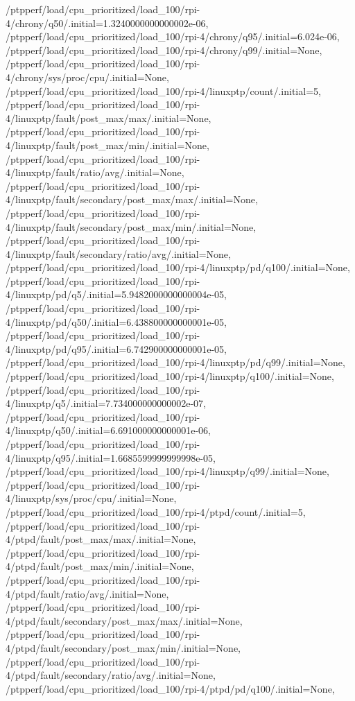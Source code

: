 {    /ptpperf/load/cpu_prioritized/load_100/rpi-4/chrony/q50/.initial=1.3240000000000002e-06,
    /ptpperf/load/cpu_prioritized/load_100/rpi-4/chrony/q95/.initial=6.024e-06,
    /ptpperf/load/cpu_prioritized/load_100/rpi-4/chrony/q99/.initial=None,
    /ptpperf/load/cpu_prioritized/load_100/rpi-4/chrony/sys/proc/cpu/.initial=None,
    /ptpperf/load/cpu_prioritized/load_100/rpi-4/linuxptp/count/.initial=5,
    /ptpperf/load/cpu_prioritized/load_100/rpi-4/linuxptp/fault/post_max/max/.initial=None,
    /ptpperf/load/cpu_prioritized/load_100/rpi-4/linuxptp/fault/post_max/min/.initial=None,
    /ptpperf/load/cpu_prioritized/load_100/rpi-4/linuxptp/fault/ratio/avg/.initial=None,
    /ptpperf/load/cpu_prioritized/load_100/rpi-4/linuxptp/fault/secondary/post_max/max/.initial=None,
    /ptpperf/load/cpu_prioritized/load_100/rpi-4/linuxptp/fault/secondary/post_max/min/.initial=None,
    /ptpperf/load/cpu_prioritized/load_100/rpi-4/linuxptp/fault/secondary/ratio/avg/.initial=None,
    /ptpperf/load/cpu_prioritized/load_100/rpi-4/linuxptp/pd/q100/.initial=None,
    /ptpperf/load/cpu_prioritized/load_100/rpi-4/linuxptp/pd/q5/.initial=5.9482000000000004e-05,
    /ptpperf/load/cpu_prioritized/load_100/rpi-4/linuxptp/pd/q50/.initial=6.438800000000001e-05,
    /ptpperf/load/cpu_prioritized/load_100/rpi-4/linuxptp/pd/q95/.initial=6.742900000000001e-05,
    /ptpperf/load/cpu_prioritized/load_100/rpi-4/linuxptp/pd/q99/.initial=None,
    /ptpperf/load/cpu_prioritized/load_100/rpi-4/linuxptp/q100/.initial=None,
    /ptpperf/load/cpu_prioritized/load_100/rpi-4/linuxptp/q5/.initial=7.734000000000002e-07,
    /ptpperf/load/cpu_prioritized/load_100/rpi-4/linuxptp/q50/.initial=6.691000000000001e-06,
    /ptpperf/load/cpu_prioritized/load_100/rpi-4/linuxptp/q95/.initial=1.6685599999999998e-05,
    /ptpperf/load/cpu_prioritized/load_100/rpi-4/linuxptp/q99/.initial=None,
    /ptpperf/load/cpu_prioritized/load_100/rpi-4/linuxptp/sys/proc/cpu/.initial=None,
    /ptpperf/load/cpu_prioritized/load_100/rpi-4/ptpd/count/.initial=5,
    /ptpperf/load/cpu_prioritized/load_100/rpi-4/ptpd/fault/post_max/max/.initial=None,
    /ptpperf/load/cpu_prioritized/load_100/rpi-4/ptpd/fault/post_max/min/.initial=None,
    /ptpperf/load/cpu_prioritized/load_100/rpi-4/ptpd/fault/ratio/avg/.initial=None,
    /ptpperf/load/cpu_prioritized/load_100/rpi-4/ptpd/fault/secondary/post_max/max/.initial=None,
    /ptpperf/load/cpu_prioritized/load_100/rpi-4/ptpd/fault/secondary/post_max/min/.initial=None,
    /ptpperf/load/cpu_prioritized/load_100/rpi-4/ptpd/fault/secondary/ratio/avg/.initial=None,
    /ptpperf/load/cpu_prioritized/load_100/rpi-4/ptpd/pd/q100/.initial=None,
}
